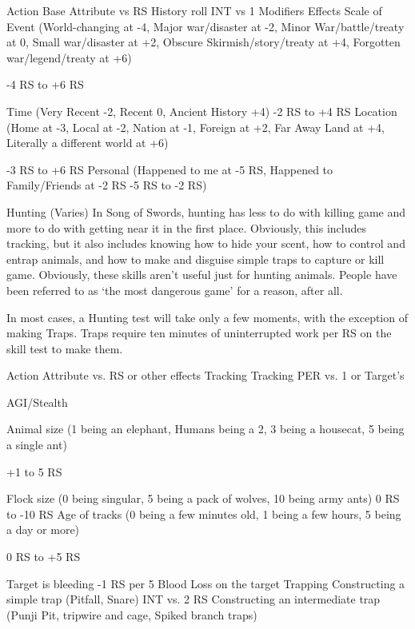 \documentclass[oneside,11pt,english]{book}
\begin{document}
 

Action Base 
Attribute vs 
RS 
History roll INT vs 1 
Modifiers Effects 
Scale of Event (World-changing at -4, Major war/disaster at -2, Minor War/battle/treaty 
at 0, Small war/disaster at +2, Obscure Skirmish/story/treaty at +4, Forgotten 
war/legend/treaty at +6) 

-4 RS to +6 
RS 

Time (Very Recent -2, Recent 0, Ancient History +4) -2 RS to +4 
RS 
Location (Home at -3, Local at -2, Nation at -1, Foreign at +2, Far Away Land at +4, 
Literally a different world at +6) 

-3 RS to +6 
RS 
Personal (Happened to me at -5 RS, Happened to Family/Friends at -2 RS -5 RS to -2 
RS)

 

 

Hunting (Varies) 
In Song of Swords, hunting has less to do with killing game and more to do with getting near it in the first 
place. Obviously, this includes tracking, but it also includes knowing how to hide your scent, how to 
control and entrap animals, and how to make and disguise simple traps to capture or kill game. 
Obviously, these skills aren’t useful just for hunting animals. People have been referred to as ‘the most 
dangerous game’ for a reason, after all. 

 

In most cases, a Hunting test will take only a few moments, with the exception of making Traps. Traps 
require ten minutes of uninterrupted work per RS on the skill test to make them. 

 

Action Attribute vs. RS or other 
effects 
Tracking 
Tracking PER vs. 1 or Target’s 


AGI/Stealth 

Animal size (1 being an elephant, Humans being a 2, 3 being a housecat, 5 
being a single ant) 

+1 to 5 RS 

Flock size (0 being singular, 5 being a pack of wolves, 10 being army ants) 0 RS to -10 RS 
Age of tracks (0 being a few minutes old, 1 being a few hours, 5 being a 
day or more) 

0 RS to +5 RS 

Target is bleeding -1 RS per 5 Blood Loss on 
the target 
Trapping 
Constructing a simple trap (Pitfall, Snare) INT vs. 2 RS 
Constructing an intermediate trap (Punji Pit, tripwire and cage, Spiked 
branch traps) 
\end{document}
